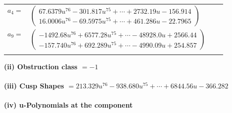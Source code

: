 \documentclass[1p]{elsarticle_modified}
\theoremstyle{definition}
\begin{document}
\begin{tabular}{m{7pt} m{180pt} m{7pt} m{180pt} }
\flushright $a_{4}=$&$\begin{pmatrix}67.6379 u^{76}-301.817 u^{75}+\cdots+2732.19 u-156.914\\16.0006 u^{76}-69.5975 u^{75}+\cdots+461.286 u-22.7965\end{pmatrix}$ \\
\flushright $a_{9}=$&$\begin{pmatrix}-1492.68 u^{76}+6577.28 u^{75}+\cdots-48928.0 u+2566.44\\-157.740 u^{76}+692.289 u^{75}+\cdots-4990.09 u+254.857\end{pmatrix}$\\&\end{tabular}
\flushleft \textbf{(ii) Obstruction class $= -1$}\\~\\
\flushleft \textbf{(iii) Cusp Shapes $= 213.329 u^{76}-938.680 u^{75}+\cdots+6844.56 u-366.282$}\\~\\
\newpage\renewcommand{\arraystretch}{1}
\flushleft \textbf{(iv) u-Polynomials at the component}\newline \\
\end{document}
